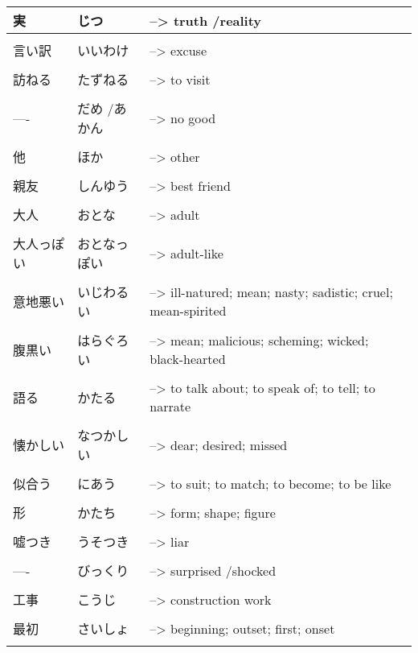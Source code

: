 \documentclass{article}
\begin{document}
\begin{tabular}{ l | l p{14cm}  }
実 & じつ &--> truth /reality \\ \hline\\[-1em]
言い訳 & いいわけ &--> excuse \\ \hline\\[-1em]
訪ねる & たずねる &--> to visit \\ \hline\\[-1em]
---- & だめ /あかん &--> no good \\ \hline\\[-1em]
他 & ほか &--> other \\ \hline\\[-1em]
親友 & しんゆう &--> best friend \\ \hline\\[-1em]
大人 & おとな &--> adult \\ \hline\\[-1em]
大人っぽい & おとなっぽい &--> adult-like \\ \hline\\[-1em]
意地悪い & いじわるい &--> ill-natured; mean; nasty; sadistic; cruel; mean-spirited \\ \hline\\[-1em]
腹黒い & はらぐろい &--> mean; malicious; scheming; wicked; black-hearted \\ \hline\\[-1em]
語る & かたる &--> to talk about; to speak of; to tell; to narrate \\ \hline\\[-1em]
懐かしい & なつかしい &--> dear; desired; missed \\ \hline\\[-1em]
似合う & にあう &--> to suit; to match; to become; to be like \\ \hline\\[-1em]
形 & かたち &--> form; shape; figure \\ \hline\\[-1em]
嘘つき & うそつき &--> liar \\ \hline\\[-1em]
---- & びっくり &--> surprised /shocked \\ \hline\\[-1em]
工事 & こうじ &--> construction work \\ \hline\\[-1em]
最初 & さいしょ &--> beginning; outset; first; onset \\ \hline\\[-1em]
\end{tabular}\\
\end{document}
